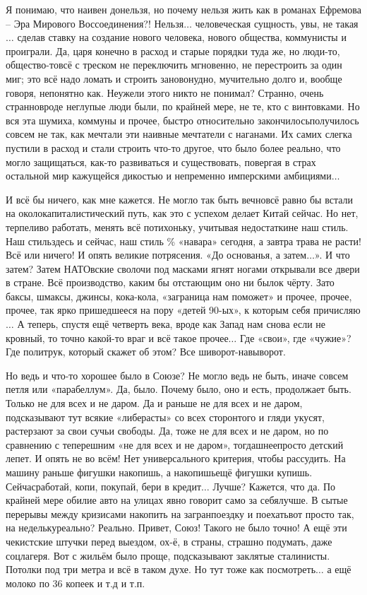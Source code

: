 Я понимаю, что наивен донельзя, но почему нельзя жить как в романах Ефремова – Эра Мирового Воссоединения?! Нельзя$\ldots$ человеческая сущность, увы, не такая$\ldots$ сделав ставку на создание нового человека, нового общества, коммунисты и проиграли. Да, царя конечно в расход и старые порядки туда же, но люди-то, общество-то\mdash всё с треском не переключить мгновенно, не перестроить за один миг; это всё надо ломать и строить заново\mdash нудно, мучительно долго и, вообще говоря, непонятно как. Неужели этого никто не понимал? Странно, очень странно\mdash вроде неглупые люди были, по крайней мере, не те, кто с винтовками. Но вся эта шумиха, коммуны и прочее, быстро относительно закончилось\mdash получилось совсем не так, как мечтали эти наивные мечтатели с наганами. Их самих слегка пустили в расход и стали строить что-то другое, что было более реально, что могло защищаться, как-то развиваться и существовать, повергая в страх остальной мир кажущейся дикостью и непременно имперскими амбициями$\ldots$

И всё бы ничего, как мне кажется. Не могло так быть вечно\mdash всё равно бы встали на околокапиталистический путь, как это с успехом делает Китай сейчас. Но нет, терпеливо работать, менять всё потихоньку, учитывая недостатки\mdash не наш стиль. Наш стиль\mdash здесь и сейчас, наш стиль \% «навара» сегодня, а завтра трава не расти! Всё или ничего! И опять великие потрясения. «До основанья, а затем$\ldots$». И что затем? Затем НАТОвские сволочи под масками ягнят ногами открывали все двери в стране. Всё производство, каким бы отстающим оно ни было\mdash к чёрту. Зато баксы, шмаксы, джинсы, кока-кола, «заграница нам поможет» и прочее, прочее, прочее, так ярко пришедшееся на пору «детей 90-ых», к которым себя причисляю$\ldots$ А теперь, спустя ещё четверть века, вроде как Запад нам снова если не кровный, то точно какой-то враг и всё такое прочее$\ldots$ Где «свои», где «чужие»? Где политрук, который скажет об этом? Все шиворот-навыворот.

Но ведь и что-то хорошее было в Союзе? Не могло ведь не быть, иначе совсем петля или «парабеллум». Да, было. Почему было, оно и есть, продолжает быть. Только не для всех и не даром. Да и раньше не для всех и не даром, подсказывают тут всякие «либерасты» со всех сторон\mdash того и гляди укусят, растерзают за свои сучьи свободы. Да, тоже не для всех и не даром, но по сравнению с теперешним «не для всех и не даром», тогдашнее\mdash просто детский лепет. И опять не во всём! Нет универсального критерия, чтобы рассудить. На машину раньше фигушки накопишь, а накопишь\mdash ещё фигушки купишь. Сейчас\mdash работай, копи, покупай, бери в кредит$\ldots$ Лучше? Кажется, что да. По крайней мере обилие авто на улицах явно говорит само за себя\mdash лучше. В сытые перерывы между кризисами накопить на загранпоездку и поехать\mdash вот просто так, на недельку\mdash реально? Реально. Привет, Союз! Такого не было точно! А ещё эти чекистские штучки перед выездом, ох-ё, в страны, страшно подумать, даже соцлагеря. Вот с жильём было проще, подсказывают заклятые сталинисты. Потолки под три метра и всё в таком духе. Но тут тоже как посмотреть$\ldots$ а ещё молоко по 36 копеек и т.д и т.п. 

